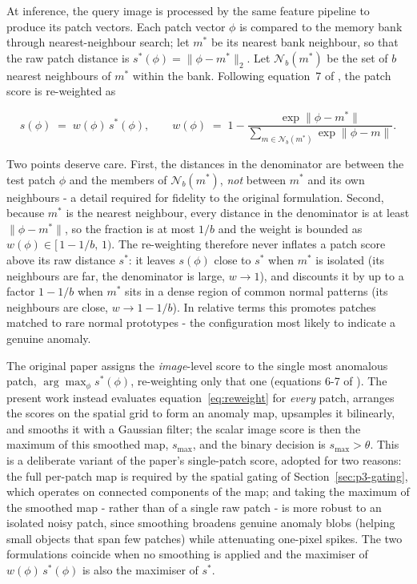 At inference, the query image is processed by the same feature pipeline to
produce its patch vectors. Each patch vector $\phi$ is compared to the memory
bank through nearest-neighbour search; let $m^{\ast}$ be its nearest bank
neighbour, so that the raw patch distance is
$s^{\ast}(\phi) = \lVert \phi - m^{\ast} \rVert_2$. Let
$\mathcal{N}_b(m^{\ast})$ be the set of $b$ nearest neighbours of $m^{\ast}$ within
the bank. Following equation~7 of \cite{Roth2022}, the patch score is re-weighted
as

\begin{equation}
  s(\phi) \;=\; w(\phi)\, s^{\ast}(\phi) , \qquad
  w(\phi) \;=\;
  1 - \frac{\exp \lVert \phi - m^{\ast} \rVert}
  {\sum_{m \in \mathcal{N}_b(m^{\ast})} \exp \lVert \phi - m \rVert} .
  \label{eq:reweight}
\end{equation}

Two points deserve care. First, the distances in the denominator are between the
test patch $\phi$ and the members of $\mathcal{N}_b(m^{\ast})$, \emph{not} between
$m^{\ast}$ and its own neighbours - a detail required for fidelity to the original
formulation. Second, because $m^{\ast}$ is the nearest neighbour, every distance
in the denominator is at least $\lVert \phi - m^{\ast} \rVert$, so the fraction is
at most $1/b$ and the weight is bounded as $w(\phi) \in [\,1 - 1/b,\, 1)$. The
re-weighting therefore never inflates a patch score above its raw distance
$s^{\ast}$: it leaves $s(\phi)$ close to $s^{\ast}$ when $m^{\ast}$ is isolated
(its neighbours are far, the denominator is large, $w \to 1$), and discounts it
by up to a factor $1 - 1/b$ when $m^{\ast}$ sits in a dense region of common
normal patterns (its neighbours are close, $w \to 1 - 1/b$). In relative terms
this promotes patches matched to rare normal prototypes - the configuration most
likely to indicate a genuine anomaly.

The original paper assigns the \emph{image}-level score to the single most
anomalous patch, $\arg\max_{\phi} s^{\ast}(\phi)$, re-weighting only that one
(equations 6-7 of \cite{Roth2022}). The present work instead evaluates
equation~\eqref{eq:reweight} for \emph{every} patch, arranges the scores on the
spatial grid to form an anomaly map, upsamples it bilinearly, and smooths it with a
Gaussian filter; the scalar image score is then the maximum of this smoothed map,
$s_{\max}$, and the binary decision is $s_{\max} > \theta$. This is a deliberate
variant of the paper's single-patch score, adopted for two reasons: the full
per-patch map is required by the spatial gating of
Section~\ref{sec:p3-gating}, which operates on connected components of the map;
and taking the maximum of the smoothed map - rather than of a single raw patch -
is more robust to an isolated noisy patch, since smoothing broadens genuine
anomaly blobs (helping small objects that span few patches) while attenuating
one-pixel spikes. The two formulations coincide when no smoothing is applied and
the maximiser of $w(\phi)\,s^{\ast}(\phi)$ is also the maximiser of $s^{\ast}$.

